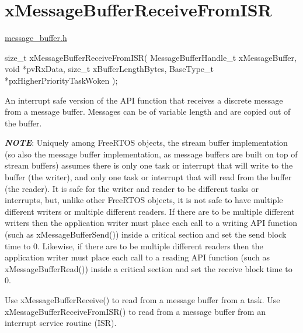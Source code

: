 \hypertarget{group__x_message_buffer_receive_from_i_s_r}{}\section{x\+Message\+Buffer\+Receive\+From\+I\+SR}
\label{group__x_message_buffer_receive_from_i_s_r}
\mbox{\hyperlink{message__buffer_8h_source}{message\+\_\+buffer.\+h}}


\begin{DoxyPre}
size\_t xMessageBufferReceiveFromISR( MessageBufferHandle\_t xMessageBuffer,
                                     void *pvRxData,
                                     size\_t xBufferLengthBytes,
                                     BaseType\_t *pxHigherPriorityTaskWoken );
\end{DoxyPre}


An interrupt safe version of the A\+PI function that receives a discrete message from a message buffer. Messages can be of variable length and are copied out of the buffer.

{\itshape {\bfseries{N\+O\+TE}}}\+: Uniquely among Free\+R\+T\+OS objects, the stream buffer implementation (so also the message buffer implementation, as message buffers are built on top of stream buffers) assumes there is only one task or interrupt that will write to the buffer (the writer), and only one task or interrupt that will read from the buffer (the reader). It is safe for the writer and reader to be different tasks or interrupts, but, unlike other Free\+R\+T\+OS objects, it is not safe to have multiple different writers or multiple different readers. If there are to be multiple different writers then the application writer must place each call to a writing A\+PI function (such as x\+Message\+Buffer\+Send()) inside a critical section and set the send block time to 0. Likewise, if there are to be multiple different readers then the application writer must place each call to a reading A\+PI function (such as x\+Message\+Buffer\+Read()) inside a critical section and set the receive block time to 0.

Use x\+Message\+Buffer\+Receive() to read from a message buffer from a task. Use x\+Message\+Buffer\+Receive\+From\+I\+S\+R() to read from a message buffer from an interrupt service routine (I\+SR).


